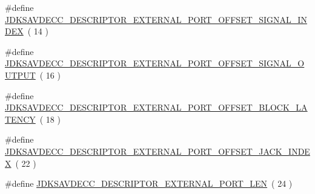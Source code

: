 \begin{DoxyCompactItemize}
\#define \hyperlink{group__descriptor__external__port_gabd488ba25c9b7af05fb8078ae1e6c4f2}{J\+D\+K\+S\+A\+V\+D\+E\+C\+C\+\_\+\+D\+E\+S\+C\+R\+I\+P\+T\+O\+R\+\_\+\+E\+X\+T\+E\+R\+N\+A\+L\+\_\+\+P\+O\+R\+T\+\_\+\+O\+F\+F\+S\+E\+T\+\_\+\+S\+I\+G\+N\+A\+L\+\_\+\+I\+N\+D\+EX}~( 14 )
\item 
\#define \hyperlink{group__descriptor__external__port_ga115662197d3fcc8eb7724ab439da4979}{J\+D\+K\+S\+A\+V\+D\+E\+C\+C\+\_\+\+D\+E\+S\+C\+R\+I\+P\+T\+O\+R\+\_\+\+E\+X\+T\+E\+R\+N\+A\+L\+\_\+\+P\+O\+R\+T\+\_\+\+O\+F\+F\+S\+E\+T\+\_\+\+S\+I\+G\+N\+A\+L\+\_\+\+O\+U\+T\+P\+UT}~( 16 )
\item 
\#define \hyperlink{group__descriptor__external__port_gabecb7dc4c4398be42046ac10cfabb3ac}{J\+D\+K\+S\+A\+V\+D\+E\+C\+C\+\_\+\+D\+E\+S\+C\+R\+I\+P\+T\+O\+R\+\_\+\+E\+X\+T\+E\+R\+N\+A\+L\+\_\+\+P\+O\+R\+T\+\_\+\+O\+F\+F\+S\+E\+T\+\_\+\+B\+L\+O\+C\+K\+\_\+\+L\+A\+T\+E\+N\+CY}~( 18 )
\item 
\#define \hyperlink{group__descriptor__external__port_ga87374fcb2c55ace4e278ae0ce3b85574}{J\+D\+K\+S\+A\+V\+D\+E\+C\+C\+\_\+\+D\+E\+S\+C\+R\+I\+P\+T\+O\+R\+\_\+\+E\+X\+T\+E\+R\+N\+A\+L\+\_\+\+P\+O\+R\+T\+\_\+\+O\+F\+F\+S\+E\+T\+\_\+\+J\+A\+C\+K\+\_\+\+I\+N\+D\+EX}~( 22 )
\item 
\#define \hyperlink{group__descriptor__external__port_ga4512b72d9fa1db851bb69a63e50ccbe6}{J\+D\+K\+S\+A\+V\+D\+E\+C\+C\+\_\+\+D\+E\+S\+C\+R\+I\+P\+T\+O\+R\+\_\+\+E\+X\+T\+E\+R\+N\+A\+L\+\_\+\+P\+O\+R\+T\+\_\+\+L\+EN}~( 24 )
\end{DoxyCompactItemize}
